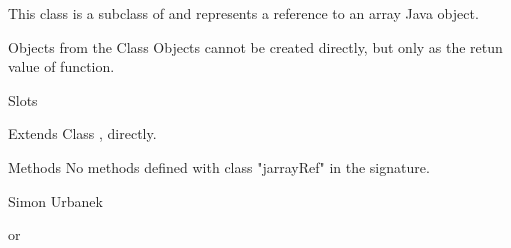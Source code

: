 \begin{Description}\relax
This class is a subclass of  and represents a reference to an array Java object.
\end{Description}
\begin{Section}{Objects from the Class}
Objects cannot be created directly, but only as the retun value of  function.
\end{Section}
\begin{Section}{Slots}
\end{Section}
\begin{Section}{Extends}
Class , directly.
\end{Section}
\begin{Section}{Methods}
No methods defined with class "jarrayRef" in the signature.
\end{Section}
\begin{Author}\relax
Simon Urbanek
\end{Author}
\begin{SeeAlso}\relax
{} or 
\end{SeeAlso}

